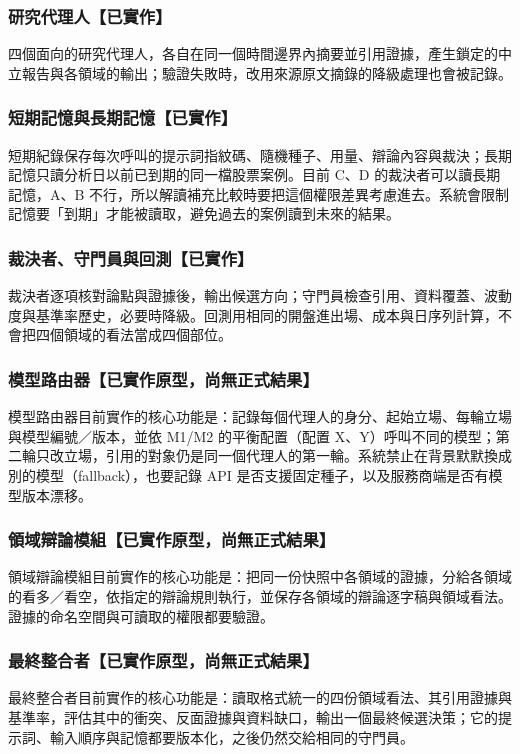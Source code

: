 \subsubsection{研究代理人【已實作】}
四個面向的研究代理人，各自在同一個時間邊界內摘要並引用證據，產生鎖定的中立報告與各領域的輸出；驗證失敗時，改用來源原文摘錄的降級處理也會被記錄。

\subsubsection{短期記憶與長期記憶【已實作】}
短期紀錄保存每次呼叫的提示詞指紋碼、隨機種子、用量、辯論內容與裁決；長期記憶只讀分析日以前已到期的同一檔股票案例。目前 C、D 的裁決者可以讀長期記憶，A、B 不行，所以解讀補充比較時要把這個權限差異考慮進去。系統會限制記憶要「到期」才能被讀取，避免過去的案例讀到未來的結果。

\subsubsection{裁決者、守門員與回測【已實作】}
裁決者逐項核對論點與證據後，輸出候選方向；守門員檢查引用、資料覆蓋、波動度與基準率歷史，必要時降級。回測用相同的開盤進出場、成本與日序列計算，不會把四個領域的看法當成四個部位。

\subsubsection{模型路由器【已實作原型，尚無正式結果】}
模型路由器目前實作的核心功能是：記錄每個代理人的身分、起始立場、每輪立場與模型編號／版本，並依 M1/M2 的平衡配置（配置 X、Y）呼叫不同的模型；第二輪只改立場，引用的對象仍是同一個代理人的第一輪。系統禁止在背景默默換成別的模型（fallback），也要記錄 API 是否支援固定種子，以及服務商端是否有模型版本漂移。

\subsubsection{領域辯論模組【已實作原型，尚無正式結果】}
領域辯論模組目前實作的核心功能是：把同一份快照中各領域的證據，分給各領域的看多／看空，依指定的辯論規則執行，並保存各領域的辯論逐字稿與領域看法。證據的命名空間與可讀取的權限都要驗證。

\subsubsection{最終整合者【已實作原型，尚無正式結果】}
最終整合者目前實作的核心功能是：讀取格式統一的四份領域看法、其引用證據與基準率，評估其中的衝突、反面證據與資料缺口，輸出一個最終候選決策；它的提示詞、輸入順序與記憶都要版本化，之後仍然交給相同的守門員。

